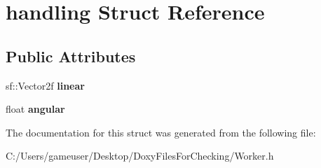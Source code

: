 \hypertarget{structhandling}{}\section{handling Struct Reference}
\label{structhandling}
\subsection*{Public Attributes}
\begin{DoxyCompactItemize}
\item 
\mbox{\label{structhandling_a20a9b5ddeb4ff323bd25d9c298722a72}} 
sf\+::\+Vector2f {\bfseries linear}
\item 
\mbox{\label{structhandling_a3f0ac2ce7791dc9df8661cbced640975}} 
float {\bfseries angular}
\end{DoxyCompactItemize}


The documentation for this struct was generated from the following file\+:\begin{DoxyCompactItemize}
\item 
C\+:/\+Users/gameuser/\+Desktop/\+Doxy\+Files\+For\+Checking/Worker.\+h\end{DoxyCompactItemize}
